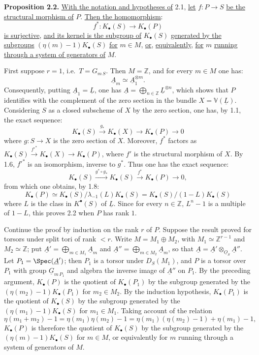%

\textbf{Proposition 2.2.} \uline{With the notation and hypotheses of} 2.1, \uline{let} $f:P\to S$ \uline{be the structural morphism of} $P$. \uline{Then the homomorphism}:
\[
f^*:K_\bullet(S)\longrightarrow K_\bullet(P)
\]
\uline{is surjective}, \uline{and its kernel is the subgroup of} $K_\bullet(S)$ \uline{generated by the subgroups} $(\eta(m)-1)K_\bullet(S)$ \uline{for} $m\in M$, \uline{or}, \uline{equivalently}, \uline{for} $m$ \uline{running through a system of generators of} $M$.

First suppose $r=1$, i.e.\ $T=G_{m\,S}$. Then $M=\mathbb Z$, and for every $m\in M$ one has:
\[
\underline{A}_m\simeq \underline{A}_1^{\otimes m}.
\]
Consequently, putting $\underline{A}_1=\underline{L}$, one has $\underline{A}=\bigoplus_{n\in\mathbb Z}\underline{L}^{\otimes n}$, which shows that $P$ identifies with the complement of the zero section in the bundle $X=\mathbb V(\underline{L})$. Considering $S$ as a closed subscheme of $X$ by the zero section, one has, by 1.1, the exact sequence:
\[
K_\bullet(S)\xrightarrow{g_*}K_\bullet(X)\longrightarrow K_\bullet(P)\longrightarrow 0
\]
where $g:S\to X$ is the zero section of $X$. Moreover, $f^*$ factors as \(K_\bullet(S)\xrightarrow{f'^*}K_\bullet(X)\longrightarrow K_\bullet(P)\), where $f'$ is the structural morphism of $X$. By 1.6, $f'^*$ is an isomorphism, inverse to $g^*$. Thus one has the exact sequence:
\[
K_\bullet(S)\xrightarrow{g^*\circ g_*}K_\bullet(S)\xrightarrow{f^*}K_\bullet(P)\longrightarrow 0,
\]
from which one obtains, by 1.8:
\[
K_\bullet(P)\simeq K_\bullet(S)/\lambda_{-1}(L)K_\bullet(S)=K_\bullet(S)/(1-L)K_\bullet(S)
\]
where $L$ is the class in $K^{\bullet}(S)$ of $\underline{L}$. Since for every $n\in\mathbb Z$, $L^n-1$ is a multiple of $1-L$, this proves 2.2 when $P$ has rank $1$.


%

Continue the proof by induction on the rank $r$ of $P$. Suppose the result proved for torsors under split tori of rank $<r$. Write $M=M_1\oplus M_2$, with $M_1\simeq\mathbb Z^{r-1}$ and $M_2\simeq\mathbb Z$; put $\underline{A}'=\bigoplus_{m\in M_1}\underline{A}_m$ and $\underline{A}''=\bigoplus_{m\in M_2}\underline{A}_m$, so that $\underline{A}=\underline{A}'\otimes_{\underline{O}_S}\underline{A}''$. Let $P_1=\Spec(\underline{A}')$; then $P_1$ is a torsor under $D_S(M_1)$, and $P$ is a torsor over $P_1$ with group $\underline{G}_{m\,P_1}$ and algebra the inverse image of $\underline{A}''$ on $P_1$. By the preceding argument, $K_\bullet(P)$ is the quotient of $K_\bullet(P_1)$ by the subgroup generated by the $(\eta(m_2)-1)K_\bullet(P_1)$ for $m_2\in M_2$. By the induction hypothesis, $K_\bullet(P_1)$ is the quotient of $K_\bullet(S)$ by the subgroup generated by the $(\eta(m_1)-1)K_\bullet(S)$ for $m_1\in M_1$. Taking account of the relation
\[
\eta(m_1+m_2)-1=\eta(m_1)\eta(m_2)-1
=\eta(m_1)(\eta(m_2)-1)+\eta(m_1)-1,
\]
$K_\bullet(P)$ is therefore the quotient of $K_\bullet(S)$ by the subgroup generated by the $(\eta(m)-1)K_\bullet(S)$ for $m\in M$, or equivalently for $m$ running through a system of generators of $M$.

